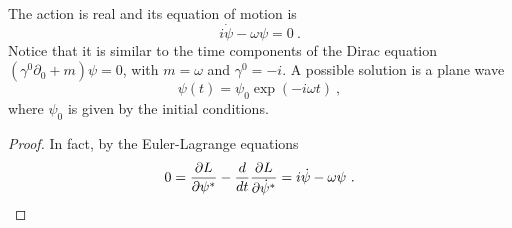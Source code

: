     The action is real and its equation of motion is 
    \begin{equation*}
        i \dot \psi - \omega \psi = 0 ~.
    \end{equation*}
    Notice that it is similar to the time components of the Dirac equation $(\gamma^0 \partial_0 + m)\psi = 0$, with $m = \omega$ and $\gamma^0 = - i$. A possible solution is a plane wave 
    \begin{equation*}
        \psi(t) = \psi_0 \exp(- i \omega t) ~,
    \end{equation*}
    where $\psi_0$ is given by the initial conditions.
    \begin{proof}
        In fact, by the Euler-Lagrange equations 
        \begin{equation*}
            0 = \frac{\partial L}{\partial\psi^*} - \frac{d}{dt} \frac{\partial L}{\partial\dot \psi^*} = i \dot \psi - \omega \psi ~.
        \end{equation*}
    \end{proof}

